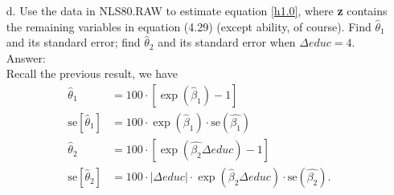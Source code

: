 \documentclass[10pt]{article}
\newcommand{\se}{\text{se}}
\begin{document}
\begin{enumerate}
\item[d.] Use the data in NLS80.RAW to estimate equation \eqref{h1.0}, where \textbf{z} contains the remaining variables in equation (4.29) (except ability, of course). Find $\hat{\theta}_1$ and its standard error; find $\hat{\theta}_2$ and its standard error when $\Delta educ=4.$ 
\\ Answer:\\

Recall the previous result, we have
\begin{align*}
    \hat{\theta}_1&=100\cdot[\exp{(\hat{\beta}_1)}-1]\\
    \se[\hat{\theta}_1]&=100\cdot\exp(\hat{\beta}_1)\cdot \se(\hat{\beta_1})\\
    \hat{\theta}_2&=100\cdot[\exp{(\hat{\beta_2}\Delta educ)}-1] \\
    \se[\hat{\theta}_2]&=100\cdot |\Delta educ| \cdot\exp(\hat{\beta}_2 \Delta educ)\cdot \se(\hat{\beta_2}).
\end{align*}
\end{enumerate}
\end{document}

